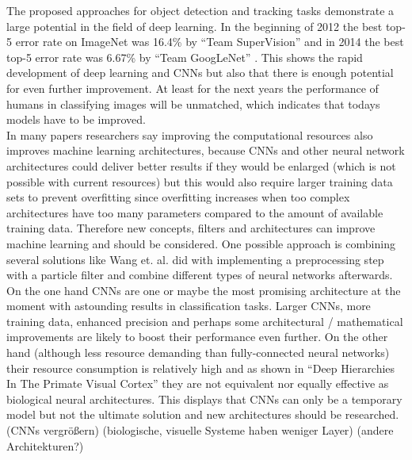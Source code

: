 \documentclass[12pt,twoside]{article}
\theoremstyle{plain}
\theoremstyle{definition}
\theoremstyle{remark}
\begin{document}
The proposed approaches for object detection and tracking tasks demonstrate a large potential in the field of deep learning.
In the beginning of 2012 the best top-5 error rate on ImageNet was 16.4\% by \enquote{Team SuperVision} and in 2014 the best top-5 error rate was 6.67\% by \enquote{Team GoogLeNet} \cite{GoogLeNet}. This shows the rapid development of deep learning and CNNs but also that there is enough potential for even further improvement. At least for the next years the performance of humans in classifying images will be unmatched, which indicates that todays models have to be improved.
\\
In many papers \cite{GoogLeNet, DeepNeuralNetworksObjectDetection-Szegedy, ImangeNetClassificationCNN-Krizhevsky, LearningDeepCompactImageTracking-Wang, MultiColumnDeepNeuralNetworksClassification-Ciresan} researchers say improving the computational resources also improves machine learning architectures, because CNNs and other neural network architectures could deliver better results if they would be enlarged (which is not possible with current resources) but this would also require larger training data sets to prevent overfitting since overfitting increases when too complex architectures have too many parameters compared to the amount of available training data. Therefore new concepts, filters and architectures can improve machine learning and should be considered. One possible approach is combining several solutions like Wang et. al. did \cite{LearningDeepCompactImageTracking-Wang} with implementing a preprocessing step with a particle filter and combine different types of neural networks afterwards.
\\
On the one hand CNNs are one or maybe the most promising architecture at the moment \cite{GoogLeNet, ImangeNetClassificationCNN-Krizhevsky} with astounding results in classification tasks. Larger CNNs, more training data, enhanced precision and perhaps some architectural / mathematical improvements are likely to boost their performance even further.
On the other hand (although less resource demanding than fully-connected neural networks) their resource consumption is relatively high and as shown in \enquote{Deep Hierarchies In The Primate Visual Cortex} \cite{DeepHierarchiesVisualCortex-kruger} they are not equivalent nor equally effective as biological neural architectures. This displays that CNNs can only be a temporary model but not the ultimate solution and new architectures should be researched.
(CNNs vergrößern)
(biologische, visuelle Systeme haben weniger Layer)
(andere Architekturen?)




%
%
\newpage


\end{document}
